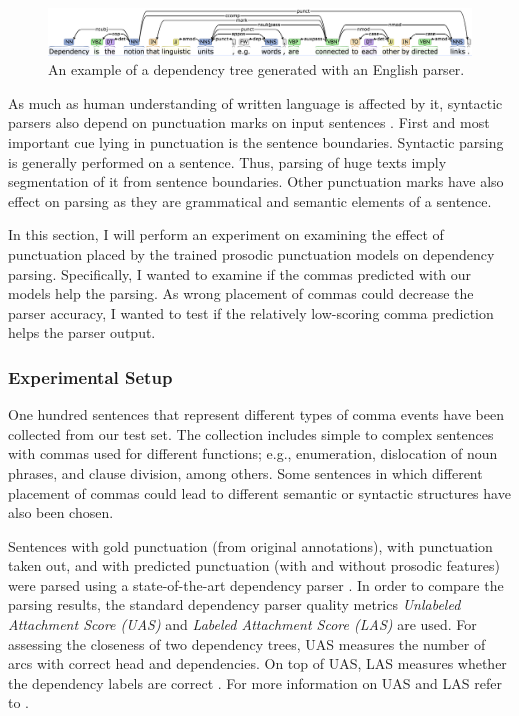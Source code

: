 \begin{figure}[h]
\centering\includegraphics[width=\linewidth]{img/dependency_tree.png}
\caption{An example of a dependency tree generated with an English parser\protect\footnotemark.}
\label{punkProse:figure:parsing}
\end{figure}


As much as human understanding of written language is affected by it, syntactic parsers also depend on punctuation marks on input sentences \citep{Jones:1994:ERP:991886.991960}. First and most important cue lying in punctuation is the sentence boundaries. Syntactic parsing is generally performed on a sentence. Thus, parsing of huge texts imply segmentation of it from sentence boundaries. Other punctuation marks have also effect on parsing as they are grammatical and semantic elements of a sentence. 

In this section, I will perform an experiment on examining the effect of punctuation placed by the trained prosodic punctuation models on dependency parsing. Specifically, I wanted to examine if the commas predicted with our models help the parsing. As wrong placement of commas could decrease the parser accuracy, I wanted to test if the relatively low-scoring comma prediction helps the parser output. 

\subsubsection*{Experimental Setup}

One hundred sentences that represent different types of comma events have been collected from our test set. The collection includes simple to complex sentences with commas used for different functions; e.g., enumeration, dislocation of noun phrases, and clause division, among others. Some sentences in which different placement of commas could lead to different semantic or syntactic structures have also been chosen. 

Sentences with gold punctuation (from original annotations), with punctuation taken out, and with predicted punctuation (with and without prosodic features) were parsed using a state-of-the-art dependency parser \citep{Bohnet:2012:BBW:2380816.2380828,
Bohnet:2012:TSJ:2390948.2391114}. In order to compare the parsing results, the standard dependency parser quality metrics \textit{Unlabeled Attachment Score (UAS)}  and \textit{Labeled Attachment Score (LAS)} are used. For assessing the closeness of two dependency trees, UAS measures the number of arcs with correct head and dependencies. On top of UAS, LAS measures whether the dependency labels are correct \citep{Buchholz:2006:CST:1596276.1596305}. For more information on UAS and LAS refer to \cite{Nivre2017UniversalDE, green:dependency}.

